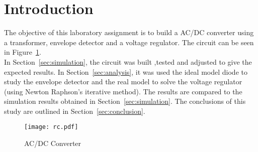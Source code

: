 \section{Introduction}
\label{sec:introduction}

\par The objective of this laboratory assignment is to build a AC/DC converter using a transformer,  envelope detector and a voltage regulator. The circuit can be seen in Figure~\ref{fig:rc}.\\


In Section~\ref{sec:simulation}, the circuit was built ,tested and adjusted to give the expected results.
In Section~\ref{sec:analysis}, it was used the ideal model diode  to study the envelope detector and the real model to solve the voltage regulator (using Newton Raphson’s iterative method). The results are compared to the simulation results obtained in Section~\ref{sec:simulation}. The conclusions of this study are outlined in
Section~\ref{sec:conclusion}.

\begin{figure}[h] \centering
\texttt{[image: rc.pdf]}
\caption{AC/DC Converter}
\label{fig:rc}
\end{figure}
